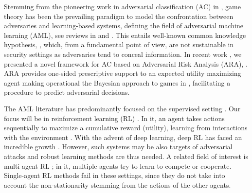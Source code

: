 Stemming from the pioneering work in adversarial classification (AC) in
\parencite{dalvi2004adversarial}, 
 game theory \parencite{menache2011network}
 has been the prevailing paradigm to model the confrontation
between adversaries and learning-based systems, 
defining the field of adversarial machine learning (AML),
 see reviews in 
\parencite{BIGGIO2018317} and \parencite{doi:10.1002/widm.1259}. This entails
well-known common
knowledge hypothesis, \parencite{hargreaves2004game}, which, from
a fundamental point of view, are  not sustainable in 
security settings 
as adversaries tend to %
conceal information. %
In recent work \parencite{naveiro2018adversarial}, we presented a novel 
framework for AC based on Adversarial Risk Analysis (ARA), \parencite{roponen}.
ARA provides one-sided prescriptive
support to an expected utility maximizing agent
 making operational the Bayesian approach to games in \parencite{kadane1982subjective, raiffa1982art}, facilitating a procedure to
predict adversarial decisions. 

The AML literature has predominantly focused on
the supervised setting \parencite{BIGGIO2018317}.
Our focus will be in reinforcement learning (RL) \parencite{sutton2012reinforcement}.
In it, an agent takes actions
sequentially to maximize a cumulative reward (utility), learning from
interactions with the environment \parencite{kaelbling1996reinforcement}. With the advent of deep learning, deep RL
has faced an incredible growth
\parencite{mnih2015human,silver2017mastering,chinorros}. 
However, such systems may be also targets of 
adversarial attacks \parencite{huang2017adversarial,lin2017tactics} 
and robust learning methods are thus
needed. 
A related field of interest is multi-agent RL \parencite{marl_over,leelee};
in it, multiple 
agents try to learn to compete or cooperate. Single-agent RL methods fail in
these settings, since they do not take into account 
the non-stationarity 
stemming from the actions of the other agents. %

